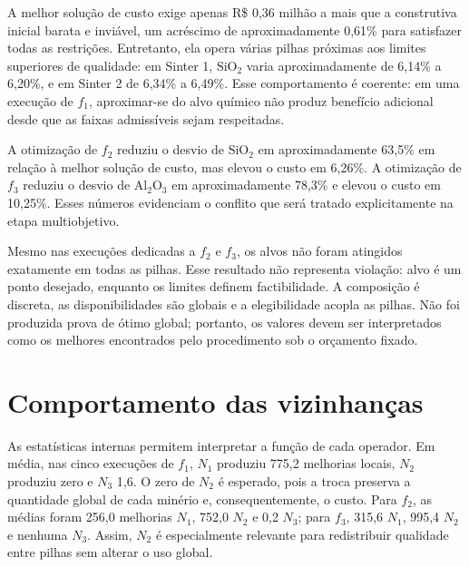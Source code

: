 \documentclass[10pt,twocolumn,a4paper]{article}
\begin{document}
\begin{table}[H]
\centering
\caption{Melhores soluções finais encontradas.}
\label{tab:melhores_solucoes}
\end{table}

A melhor solução de custo exige apenas R\$ 0,36 milhão a mais que a construtiva inicial barata e inviável, um acréscimo de aproximadamente 0,61\% para satisfazer todas as restrições. Entretanto, ela opera várias pilhas próximas aos limites superiores de qualidade: em Sinter 1, $\text{SiO}_2$ varia aproximadamente de 6,14\% a 6,20\%, e em Sinter 2 de 6,34\% a 6,49\%. Esse comportamento é coerente: em uma execução de $f_1$, aproximar-se do alvo químico não produz benefício adicional desde que as faixas admissíveis sejam respeitadas.

A otimização de $f_2$ reduziu o desvio de $\text{SiO}_2$ em aproximadamente 63,5\% em relação à melhor solução de custo, mas elevou o custo em 6,26\%. A otimização de $f_3$ reduziu o desvio de $\text{Al}_2\text{O}_3$ em aproximadamente 78,3\% e elevou o custo em 10,25\%. Esses números evidenciam o conflito que será tratado explicitamente na etapa multiobjetivo.

Mesmo nas execuções dedicadas a $f_2$ e $f_3$, os alvos não foram atingidos exatamente em todas as pilhas. Esse resultado não representa violação: alvo é um ponto desejado, enquanto os limites definem factibilidade. A composição é discreta, as disponibilidades são globais e a elegibilidade acopla as pilhas. Não foi produzida prova de ótimo global; portanto, os valores devem ser interpretados como os melhores encontrados pelo procedimento sob o orçamento fixado.

\section{Comportamento das vizinhanças}

As estatísticas internas permitem interpretar a função de cada operador. Em média, nas cinco execuções de $f_1$, $N_1$ produziu 775,2 melhorias locais, $N_2$ produziu zero e $N_3$ 1,6. O zero de $N_2$ é esperado, pois a troca preserva a quantidade global de cada minério e, consequentemente, o custo. Para $f_2$, as médias foram 256,0 melhorias $N_1$, 752,0 $N_2$ e 0,2 $N_3$; para $f_3$, 315,6 $N_1$, 995,4 $N_2$ e nenhuma $N_3$. Assim, $N_2$ é especialmente relevante para redistribuir qualidade entre pilhas sem alterar o uso global.
\end{document}
